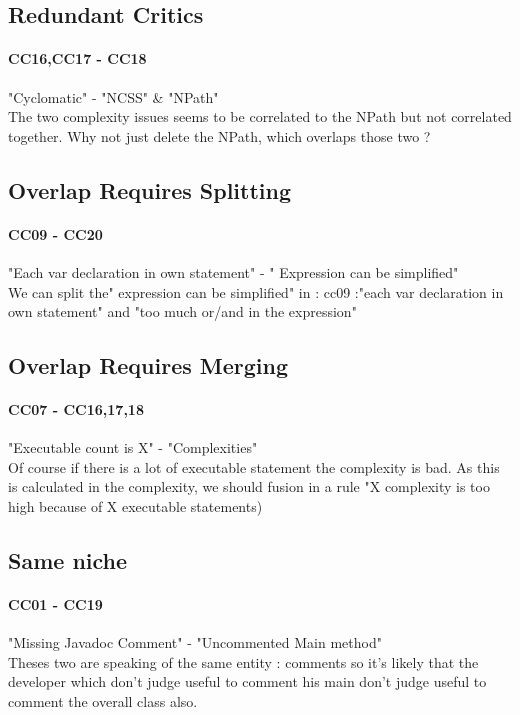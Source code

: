 \documentclass{article}
\begin{document}
\subsection{Redundant Critics}
\paragraph{CC16,CC17 - CC18 }
 "Cyclomatic" - "NCSS" \& "NPath" \\
The two complexity issues seems to be correlated to the NPath but not correlated together. Why not just delete the NPath, which overlaps those two ?

\subsection{Overlap Requires Splitting}
\paragraph{CC09  - CC20}
"Each var declaration in own statement" - " Expression can be simplified" \\
We can split the" expression can be simplified" in : cc09 :"each var declaration in own statement" and "too much or/and in the expression" 

\subsection{Overlap Requires Merging}
\paragraph{CC07 - CC16,17,18}
"Executable count is X" -  "Complexities"\\
Of course if there is a lot of executable statement the complexity is bad. As this is calculated in the complexity, we should fusion in a rule "X complexity is too high because of X executable statements) 





\subsection{Same niche}
\paragraph{CC01 - CC19} 
 "Missing Javadoc Comment" - "Uncommented Main method" \\
Theses two are speaking of the same entity : comments so it's likely that the developer which don't judge useful to comment his main don't judge useful to comment the overall class also.
\end{document}
